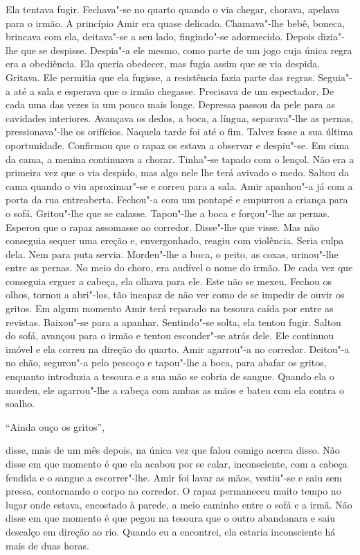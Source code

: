 Ela tentava fugir. Fechava"-se no quarto quando o via chegar, chorava,
apelava para o irmão. A princípio Amir era quase delicado. Chamava"-lhe
bebê, boneca, brincava com ela, deitava"-se a seu lado, fingindo"-se
adormecido. Depois dizia"-lhe que se despisse. Despia"-a ele mesmo, como
parte de um jogo cuja única regra era a obediência. Ela queria obedecer,
mas fugia assim que se via despida. Gritava. Ele permitia que ela
fugisse, a resistência fazia parte das regras. Seguia"-a até a sala e
esperava que o irmão chegasse. Precisava de um espectador. De cada uma
das vezes ia um pouco mais longe. Depressa passou da pele para as
cavidades interiores. Avançava os dedos, a boca, a língua, separava"-lhe
as pernas, pressionava"-lhe os orifícios. Naquela tarde foi até o fim.
Talvez fosse a sua última oportunidade. Confirmou que o rapaz os estava
a observar e despiu"-se. Em cima da cama, a menina continuava a chorar.
Tinha"-se tapado com o lençol. Não era a primeira vez que o via despido,
mas algo nele lhe terá avivado o medo. Saltou da cama quando o viu
aproximar"-se e correu para a sala. Amir apanhou"-a já com a porta da
rua entreaberta. Fechou"-a com um pontapé e empurrou a criança para o
sofá. Gritou"-lhe que se calasse. Tapou"-lhe a boca e forçou"-lhe as
pernas. Esperou que o rapaz assomasse ao corredor. Disse"-lhe que visse.
Mas não conseguia sequer uma ereção e, envergonhado, reagiu com
violência. Seria culpa dela. Nem para puta servia. Mordeu"-lhe a boca, o
peito, as coxas, urinou"-lhe entre as pernas. No meio do choro, era
audível o nome do irmão. De cada vez que conseguia erguer a cabeça, ela
olhava para ele. Este não se mexeu. Fechou os olhos, tornou a abri"-los,
tão incapaz de não ver como de se impedir de ouvir os gritos. Em algum
momento Amir terá reparado na tesoura caída por entre as revistas.
Baixou"-se para a apanhar. Sentindo"-se solta, ela tentou fugir. Saltou
do sofá, avançou para o irmão e tentou esconder"-se atrás dele. Ele
continuou imóvel e ela correu na direção do quarto. Amir agarrou"-a no
corredor. Deitou"-a no chão, segurou"-a pelo pescoço e tapou"-lhe a
boca, para abafar os gritos, enquanto introduzia a tesoura e a sua mão
se cobria de sangue. Quando ela o mordeu, ele agarrou"-lhe a cabeça com
ambas as mãos e bateu com ela contra o soalho.

``Ainda ouço os gritos'',

disse, mais de um mês depois, na única vez que falou comigo acerca
disso. Não disse em que momento é que ela acabou por se calar,
inconsciente, com a cabeça fendida e o sangue a escorrer"-lhe. Amir foi
lavar as mãos, vestiu"-se e saiu sem pressa, contornando o corpo no
corredor. O rapaz permaneceu muito tempo no lugar onde estava, encostado
à parede, a meio caminho entre o sofá e a irmã. Não disse em que momento
é que pegou na tesoura que o outro abandonara e saiu descalço em
direção ao rio. Quando eu a encontrei, ela estaria inconsciente há mais
de duas horas.

